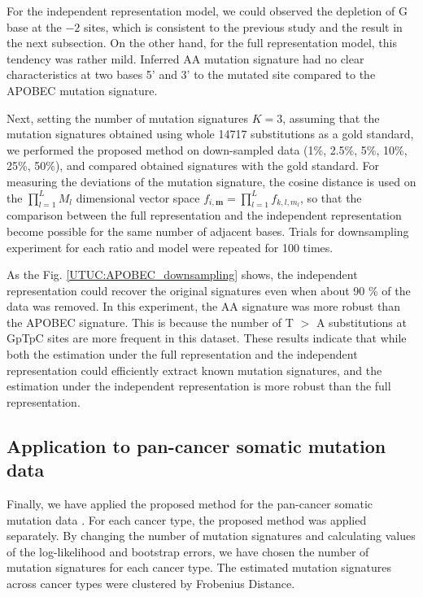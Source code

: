 For the independent representation model, we could observed the depletion of G base at the $-2$ sites,
which is consistent to the previous study \cite{pmid23318258} and the result in the next subsection.
On the other hand, for the full representation model, this tendency was rather mild.
Inferred AA mutation signature had no clear characteristics at two bases 5' and 3' to the mutated site 
compared to the APOBEC mutation signature.


Next, setting the number of mutation signatures $K = 3$, assuming that the mutation signatures obtained using whole 14717 substitutions as a gold standard, 
we performed the proposed method on down-sampled data (1\%, 2.5\%, 5\%, 10\%, 25\%, 50\%), 
and compared obtained signatures with the gold standard.
For measuring the deviations of the mutation signature, the cosine distance is used on the $\prod_{l=1}^L M_l$ dimensional vector space $f_{i, \bm{m}} = \prod_{l=1}^L f_{k,l,m_l}$,
so that the comparison between the full representation and the independent representation become possible for the same number of adjacent bases.
Trials for downsampling experiment for each ratio and model were repeated for 100 times.

As the Fig. \ref{UTUC:APOBEC_downsampling} shows,  the independent representation could recover the original signatures even when about 90 \% of the data was removed.
In this experiment, the AA signature was more robust than the APOBEC signature.
This is because the number of T $>$ A substitutions at GpTpC sites are more frequent in this dataset.
These results indicate that while both the estimation under the full representation and the independent representation could efficiently extract known mutation signatures,
and the estimation under the independent representation is more robust than the full representation.



\subsection*{Application to pan-cancer somatic mutation data}

Finally, we have applied the proposed method for the pan-cancer somatic mutation data \cite{pmid23945592}.
For each cancer type, the proposed method was applied separately.
By changing the number of mutation signatures and calculating values of the log-likelihood and bootstrap errors,
we have chosen the number of mutation signatures for each cancer type.
The estimated mutation signatures across cancer types were clustered by Frobenius Distance.



